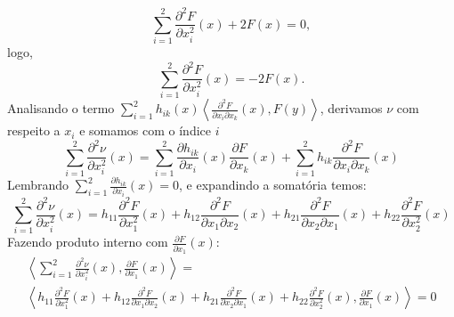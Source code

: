 \begin{demonstracao}
	\begin{equation*}
	\sum_{i=1}^2 \frac{\partial^2 F}{\partial x_i^2}(x) + 2 F(x) = 0,
	\end{equation*}
	logo,
	\[
	\sum_{i=1}^2 \frac{\partial^2 F}{\partial x_i^2}(x) = -2 F(x).
	\]
	Analisando o termo $\sum_{i=1}^2 h_{ik}(x) \left\langle \frac{\partial^2 F}{\partial x_i \partial x_k}(x), F(y) \right\rangle$, derivamos $\nu$ com respeito a $x_i$ e somamos com o índice $i$
	\begin{equation*}
	\sum_{i=1}^2 \frac{\partial^2 \nu}{\partial x_i^2}(x) = 
	\sum_{i=1}^2 \frac{\partial h_{ik}}{\partial x_i}(x) 
	\frac{\partial F}{\partial x_k}(x) + \sum_{i=1}^2 h_{ik} 
	\frac{\partial^2 F}{\partial x_i \partial x_k}(x)
	\end{equation*}
	Lembrando $\sum_{i=1}^2 \frac{\partial h_{ik}}{\partial x_i}(x) = 0$, e expandindo a somatória  temos:
	\begin{equation*}
	\sum_{i=1}^2 \frac{\partial^2 \nu}{\partial x_i^2}(x) =  h_{11} \frac{\partial^2 F}{\partial x_1^2}(x) + h_{12} \frac{\partial^2 F}{\partial x_1 \partial x_2}(x) + h_{21} \frac{\partial^2 F}{\partial x_2 \partial x_1}(x) + h_{22} \frac{\partial^2 F}{\partial x_2^2}(x)
	\end{equation*}
	Fazendo produto interno com $\frac{\partial F}{\partial x_1}(x)$:
	\begin{multline*}
	\left\langle \sum_{i=1}^2 \frac{\partial^2 \nu}{\partial x_i^2}(x), \frac{\partial F}{\partial x_1}(x) \right\rangle =\\
	\left\langle h_{11} \frac{\partial^2 F}{\partial x_1^2}(x) + h_{12} \frac{\partial^2 F}{\partial x_1 \partial x_2}(x) + h_{21} \frac{\partial^2 F}{\partial x_2 \partial x_1}(x) + h_{22} \frac{\partial^2 F}{\partial x_2^2}(x), \frac{\partial F}{\partial x_1}(x) \right\rangle = 0
	\end{multline*}

\end{demonstracao}
